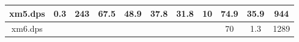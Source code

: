 \begin{table}[]
\begin{tabular}{|c|c|c|c|c|c|c|c|c|c|c|}
		xm5.dps              & 0.3                                                                   & 243 & 67.5 & 48.9 & 37.8 & 31.8 & 10                                                                    & 74.9                                                                    & 35.9               & 944          \\ \hline
		xm6.dps              &                                                                       &     &      &      &      &      &                                                                       & 70                                                                      & 1.3                & 1289         \\ \hline
	\end{tabular}
\end{table}
